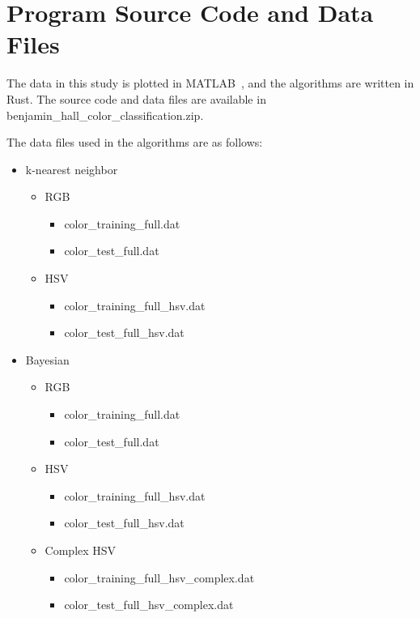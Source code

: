 \documentclass[twoside]{IEEEtran}
\begin{document}
\section{Program Source Code and Data Files}%
\label{program_source}

The data in this study is plotted in MATLAB~\cite{matlab}, and the algorithms are written in Rust.
The source code and data files are available in \mbox{benjamin\_hall\_color\_classification.zip}.

The data files used in the algorithms are as follows:
\begin{itemize}
    \item k-nearest neighbor
          \begin{itemize}
              \item RGB
                    \begin{itemize}
                        \item color\_training\_full.dat
                        \item color\_test\_full.dat
                    \end{itemize}
              \item HSV
                    \begin{itemize}
                        \item color\_training\_full\_hsv.dat
                        \item color\_test\_full\_hsv.dat
                    \end{itemize}
          \end{itemize}

    \item Bayesian
          \begin{itemize}
              \item RGB
                    \begin{itemize}
                        \item color\_training\_full.dat
                        \item color\_test\_full.dat
                    \end{itemize}
              \item HSV
                    \begin{itemize}
                        \item color\_training\_full\_hsv.dat
                        \item color\_test\_full\_hsv.dat
                    \end{itemize}
              \item Complex HSV
                    \begin{itemize}
                        \item color\_training\_full\_hsv\_complex.dat
                        \item color\_test\_full\_hsv\_complex.dat
                    \end{itemize}
          \end{itemize}


\end{itemize}
\end{document}
